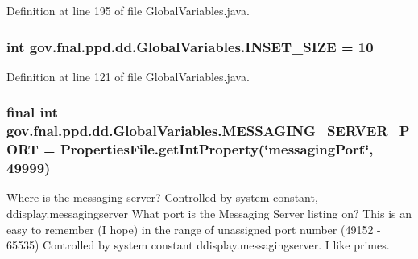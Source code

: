 Definition at line 195 of file Global\-Variables.\-java.

\hypertarget{classgov_1_1fnal_1_1ppd_1_1dd_1_1GlobalVariables_a938952f27836544cbcf8eed0fceecb99}{
\subsubsection[{I\-N\-S\-E\-T\-\_\-\-S\-I\-Z\-E}]{\setlength{\rightskip}{0pt plus 5cm}int gov.\-fnal.\-ppd.\-dd.\-Global\-Variables.\-I\-N\-S\-E\-T\-\_\-\-S\-I\-Z\-E = 10\hspace{0.3cm}{\ttfamily [static]}}}\label{classgov_1_1fnal_1_1ppd_1_1dd_1_1GlobalVariables_a938952f27836544cbcf8eed0fceecb99}


Definition at line 121 of file Global\-Variables.\-java.

\hypertarget{classgov_1_1fnal_1_1ppd_1_1dd_1_1GlobalVariables_a3afb8f4fd1dbbc82329ea9ff4aa3629e}{
\subsubsection[{M\-E\-S\-S\-A\-G\-I\-N\-G\-\_\-\-S\-E\-R\-V\-E\-R\-\_\-\-P\-O\-R\-T}]{\setlength{\rightskip}{0pt plus 5cm}final int gov.\-fnal.\-ppd.\-dd.\-Global\-Variables.\-M\-E\-S\-S\-A\-G\-I\-N\-G\-\_\-\-S\-E\-R\-V\-E\-R\-\_\-\-P\-O\-R\-T = {\bf Properties\-File.\-get\-Int\-Property}(\char`\"{}messaging\-Port\char`\"{}, 49999)\hspace{0.3cm}{\ttfamily [static]}}}\label{classgov_1_1fnal_1_1ppd_1_1dd_1_1GlobalVariables_a3afb8f4fd1dbbc82329ea9ff4aa3629e}
Where is the messaging server? Controlled by system constant, ddisplay.\-messagingserver What port is the Messaging Server listing on? This is an easy to remember (I hope) in the range of unassigned port number (49152 -\/ 65535) Controlled by system constant ddisplay.\-messagingserver. I like primes. 

